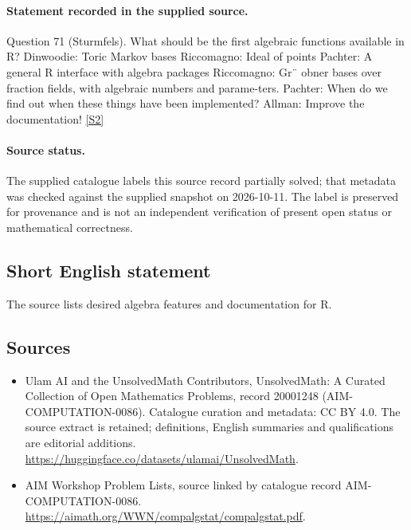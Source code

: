 \documentclass[11pt]{article}
\begin{document}
\paragraph{Statement recorded in the supplied source.}
Question 71 (Sturmfels). What should be the first algebraic functions available in R? Dinwoodie: Toric Markov bases Riccomagno: Ideal of points Pachter: A general R interface with algebra packages Riccomagno: Gr¨ obner bases over fraction fields, with algebraic numbers and parame-ters. Pachter: When do we find out when these things have been implemented? Allman: Improve the documentation! \href{https://aimath.org/WWN/compalgstat/compalgstat.pdf}{[S2]}
\paragraph{Source status.}
The supplied catalogue labels this source record partially solved; that metadata was checked against the supplied snapshot on 2026-10-11. The label is preserved for provenance and is not an independent verification of present open status or mathematical correctness.
\subsection{Short English statement}
The source lists desired algebra features and documentation for R.
\subsection{Sources}
\begin{itemize}
\item[S1] Ulam AI and the UnsolvedMath Contributors, UnsolvedMath: A Curated Collection of Open Mathematics Problems, record 20001248 (AIM-COMPUTATION-0086). Catalogue curation and metadata: CC BY 4.0. The source extract is retained; definitions, English summaries and qualifications are editorial additions.
\url{https://huggingface.co/datasets/ulamai/UnsolvedMath}.
\item[S2] AIM Workshop Problem Lists, source linked by catalogue record AIM-COMPUTATION-0086.
\url{https://aimath.org/WWN/compalgstat/compalgstat.pdf}.
\end{itemize}
\end{document}
